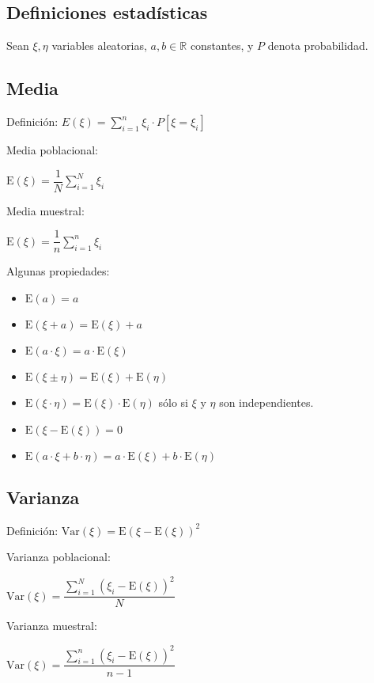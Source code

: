 \documentclass[10pt, a4paper, landscape]{extarticle}
\newcommand{\E}{\mathrm{E}}
\newcommand{\Var}{\mathrm{Var}}
\begin{document}
\begin{multicols}{3}
\columnbreak

\section*{Definiciones estadísticas}

Sean $\xi, \eta$ variables aleatorias, $a, b \in \mathbb{R}$ constantes, y $P$ denota probabilidad.

\subsection*{Media}

Definición: \quad $E(\xi) = \sum_{i=1}^{n} \xi_i \cdot P[\xi = \xi_i]$

\begin{multicols}{2}
	Media poblacional:
	\begin{center}
		$\E(\xi) = \dfrac{1}{N} \sum_{i=1}^{N} \xi_i$
	\end{center}
\columnbreak
	Media muestral:
	\begin{center}
		$\E(\xi) = \dfrac{1}{n} \sum_{i=1}^{n} \xi_i$
	\end{center}
\end{multicols}

Algunas propiedades:

\begin{itemize}[leftmargin=*]
	\item $\E(a) = a$
	\item $\E(\xi + a) = \E(\xi) + a$
	\item $\E(a \cdot \xi) = a \cdot \E(\xi)$
	\item $\E(\xi \pm \eta) = \E(\xi) + \E(\eta)$
	\item $\E(\xi \cdot \eta) = \E(\xi) \cdot \E(\eta)$ \quad sólo si $\xi$ y $\eta$ son independientes.
	\item $\E(\xi - \E(\xi)) = 0$
	\item $\E(a \cdot \xi + b \cdot \eta) = a \cdot \E(\xi) + b \cdot \E(\eta)$
\end{itemize}

\subsection*{Varianza}

Definición: \quad $\Var(\xi) = \E(\xi - \E(\xi))^2$

\begin{multicols}{2}
	Varianza poblacional:
	\begin{center}
		$\Var(\xi) = \dfrac{\sum_{i=1}^{N} (\xi_i - \E(\xi))^2}{N}$
	\end{center}
\columnbreak
	Varianza muestral:
	\begin{center}
		$\Var(\xi) = \dfrac{\sum_{i=1}^{n} (\xi_i - \E(\xi))^2}{n - 1}$
	\end{center}
\end{multicols}


\end{multicols}
\end{document}
